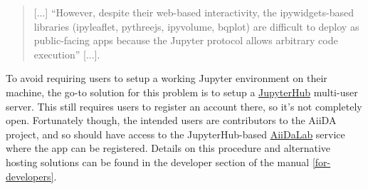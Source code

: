 \begin{quote}
    [...] ``However, despite their web-based interactivity, the ipywidgets-based
    libraries (ipyleaflet, pythreejs, ipyvolume, bqplot) are difficult to deploy
    as public-facing apps because the Jupyter protocol allows arbitrary code
    execution'' [...].
\end{quote}

To avoid requiring users to setup a working Jupyter environment on their
machine, the go-to solution for this problem is to setup a
\href{https://jupyter.org/hub}{JupyterHub} multi-user server. This still
requires users to register an account there, so it's not completely open.
Fortunately though, the intended users are contributors to the AiiDA project,
and so should have access to the JupyterHub-based \href{
  https://aiidalab.materialscloud.org/}{AiiDaLab} service where the app can be
registered. Details on this procedure and alternative hosting solutions can be
found in the developer section of the manual \vref{for-developers}.



